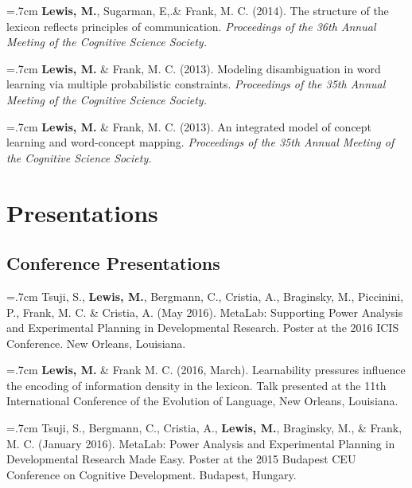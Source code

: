 \documentclass[letterpaper]{article}
\begin{document}
 \hangindent=.7cm {\bf Lewis, M.}, Sugarman, E,.\& Frank, M. C. (2014). The structure of the lexicon reflects principles of communication. { \it Proceedings of the 36th Annual Meeting of the Cognitive Science Society.}
  
  
 \hangindent=.7cm {\bf Lewis, M.} \& Frank, M. C. (2013). Modeling disambiguation in word learning via multiple probabilistic constraints. { \it Proceedings of the 35th Annual Meeting of the Cognitive Science Society.}

 \hangindent=.7cm {\bf Lewis, M.} \& Frank, M. C. (2013). An integrated model of concept learning and word-concept mapping.{ \it Proceedings of the 35th Annual Meeting of the Cognitive Science Society.}
 
 \singlespacing
 
\section*{Presentations}
\onehalfspacing

\subsection*{Conference Presentations}

 \hangindent=.7cm  Tsuji, S., {\bf Lewis, M.}, Bergmann, C., Cristia, A.,  Braginsky, M.,  Piccinini, P., Frank, M. C. \& Cristia, A. (May 2016). MetaLab: Supporting Power Analysis and Experimental Planning in Developmental Research. Poster at the 2016 ICIS Conference. New Orleans, Louisiana.


  \hangindent=.7cm {\bf Lewis, M.} \& Frank M. C. (2016, March). Learnability pressures influence the encoding of information density in the lexicon. Talk presented at the 11th International Conference of the Evolution of Language, New Orleans, Louisiana.
  
  \hangindent=.7cm  Tsuji, S., Bergmann, C., Cristia, A., {\bf Lewis, M.}, Braginsky, M., \& Frank, M. C. (January 2016). MetaLab: Power Analysis and Experimental Planning in Developmental Research Made Easy. Poster at the 2015 Budapest CEU Conference on Cognitive Development. Budapest, Hungary.
\end{document}
